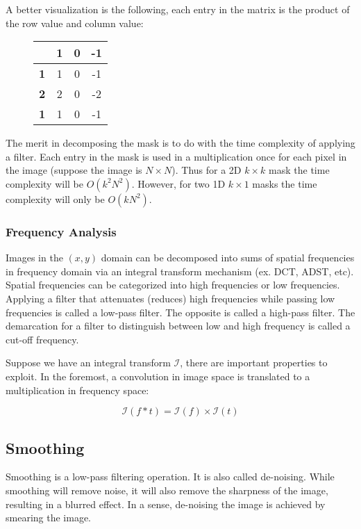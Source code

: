 \documentclass{article}
\begin{document}
\begin{multicols}{3}
A better visualization is the following, each entry in the matrix is the product of the row value and column value:
\begin{figure}[H]
  \centering
\begin{tabular}{c|ccc}
  & \textbf{1} & \textbf{0} & \textbf{-1}\\
  \hline
  \textbf{1} & 1 & 0 & -1\\
  \textbf{2} & 2 & 0 & -2\\
  \textbf{1} & 1 & 0 & -1
\end{tabular}
\end{figure}

The merit in decomposing the mask is to do with the time complexity of applying a filter. Each entry in the mask is used in a multiplication once for each pixel in the image (suppose the image is $N \times N$). Thus for a 2D $k \times k$ mask the time complexity will be $O(k^2N^2)$. However, for two 1D $k \times 1$ masks the time complexity will only be $O(kN^2)$.

\subsubsection{Frequency Analysis}

Images in the $(x,y)$ domain can be decomposed into sums of spatial frequencies in frequency domain via an integral transform mechanism (ex. DCT, ADST, etc). Spatial frequencies can be categorized into high frequencies or low frequencies. Applying a filter that attenuates (reduces) high frequencies while passing low frequencies is called a low-pass filter. The opposite is called a high-pass filter. The demarcation for a filter to distinguish between low and high frequency is called a cut-off frequency.

Suppose we have an integral transform $\mathcal{I}$, there are important properties to exploit. In the foremost, a convolution in image space is translated to a multiplication in frequency space:

$$
\mathcal{I}(f * t) = \mathcal{I}(f) \times \mathcal{I}(t)
$$

\subsection{Smoothing}

Smoothing is a low-pass filtering operation. It is also called de-noising. While smoothing will remove noise, it will also remove the sharpness of the image, resulting in a blurred effect. In a sense, de-noising the image is achieved by smearing the image.


\end{multicols}
\end{document}
